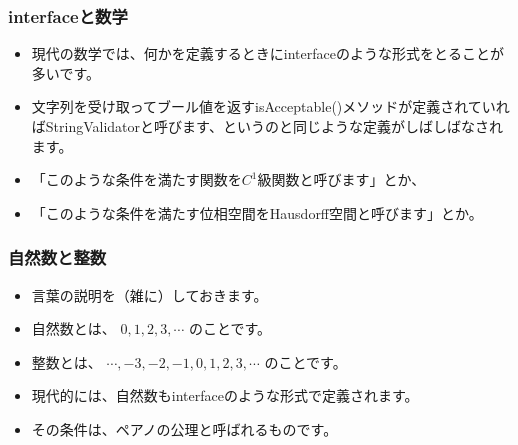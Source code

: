\documentclass[dvipdfmx]{beamer}
\begin{document}



  \begin{frame}
    \frametitle{interfaceと数学}

    \begin{itemize}
      \item 現代の数学では、何かを定義するときにinterfaceのような形式をとることが多いです。
      \item 文字列を受け取ってブール値を返すisAcceptable()メソッドが定義されていればStringValidatorと呼びます、というのと同じような定義がしばしばなされます。

      \pause

      \item 「このような条件を満たす関数を$C^1$級関数と呼びます」とか、
      \item 「このような条件を満たす位相空間をHausdorff空間と呼びます」とか。
    \end{itemize}

  \end{frame}

  \begin{frame}
    \frametitle{自然数と整数}

    \begin{itemize}
      \item 言葉の説明を（雑に）しておきます。
      \item 自然数とは、 $0, 1, 2, 3, \cdots$ のことです。
      \item 整数とは、 $\cdots, -3, -2, -1, 0, 1, 2, 3, \cdots$ のことです。

      \pause

      \item 現代的には、自然数もinterfaceのような形式で定義されます。
      \item その条件は、ペアノの公理と呼ばれるものです。
    \end{itemize}

  \end{frame}
\end{document}
